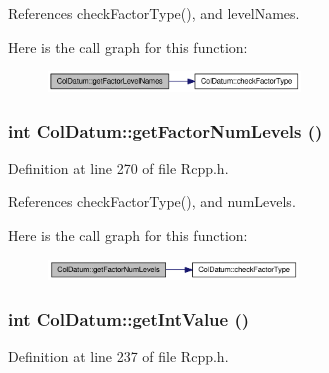 References checkFactorType(), and levelNames.

Here is the call graph for this function:\nopagebreak
\begin{figure}[H]
\begin{center}
\leavevmode
\includegraphics[width=190pt]{classColDatum_4376ad852efcf177fad6f168a8f44877_cgraph}
\end{center}
\end{figure}
\hypertarget{classColDatum_9b5db8254be428e68c61805f02723821}{
\subsubsection[{getFactorNumLevels}]{\setlength{\rightskip}{0pt plus 5cm}int ColDatum::getFactorNumLevels ()}}
\label{classColDatum_9b5db8254be428e68c61805f02723821}




Definition at line 270 of file Rcpp.h.

References checkFactorType(), and numLevels.

Here is the call graph for this function:\nopagebreak
\begin{figure}[H]
\begin{center}
\leavevmode
\includegraphics[width=188pt]{classColDatum_9b5db8254be428e68c61805f02723821_cgraph}
\end{center}
\end{figure}
\hypertarget{classColDatum_f498266608526c9db7f865bc66cc5e40}{
\subsubsection[{getIntValue}]{\setlength{\rightskip}{0pt plus 5cm}int ColDatum::getIntValue ()}}
\label{classColDatum_f498266608526c9db7f865bc66cc5e40}




Definition at line 237 of file Rcpp.h.

